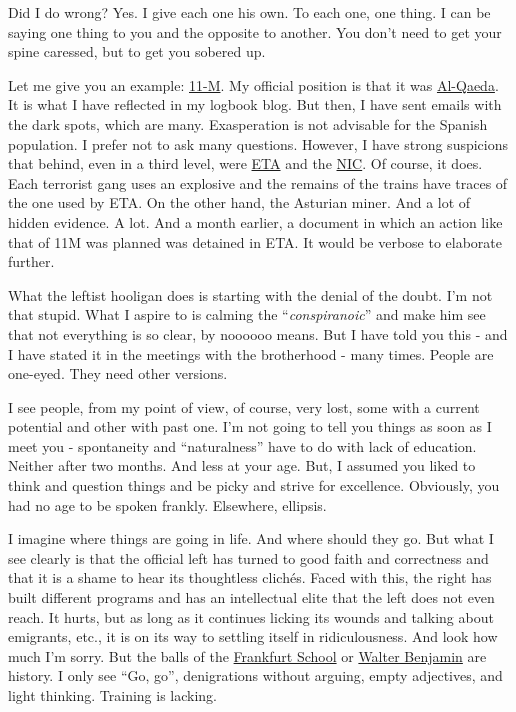 \documentclass[]{book}
\begin{document}
Did I do wrong? Yes. I give each one his own. To each one, one thing. I can be saying one thing to you and the opposite to another. You don't need to get your spine caressed, but to get you sobered up.

Let me give you an example: \href{https://en.wikipedia.org/wiki/2004_Madrid_train_bombings}{11-M}. My official position is that it was \href{https://en.wikipedia.org/wiki/Al-Qaeda}{Al-Qaeda}. It is what I have reflected in my logbook blog. But then, I have sent emails with the dark spots, which are many. Exasperation is not advisable for the Spanish population. I prefer not to ask many questions. However, I have strong suspicions that behind, even in a third level, were \href{https://en.wikipedia.org/wiki/ETA_(separatist_group)}{ETA} and the \href{https://en.wikipedia.org/wiki/National_Intelligence_Centre}{NIC}. Of course, it does. Each terrorist gang uses an explosive and the remains of the trains have traces of the one used by ETA. On the other hand, the Asturian miner. And a lot of hidden evidence. A lot. And a month earlier, a document in which an action like that of 11M was planned was detained in ETA. It would be verbose to elaborate further.

What the leftist hooligan does is starting with the denial of the doubt. I'm not that stupid. What I aspire to is calming the ``\emph{conspiranoic}'' and make him see that not everything is so clear, by noooooo means. But I have told you this - and I have stated it in the meetings with the brotherhood - many times. People are one-eyed. They need other versions.

I see people, from my point of view, of course, very lost, some with a current potential and other with past one. I'm not going to tell you things as soon as I meet you - spontaneity and ``naturalness'' have to do with lack of education. Neither after two months. And less at your age. But, I assumed you liked to think and question things and be picky and strive for excellence. Obviously, you had no age to be spoken frankly. Elsewhere, ellipsis.

I imagine where things are going in life. And where should they go. But what I see clearly is that the official left has turned to good faith and correctness and that it is a shame to hear its thoughtless clichés. Faced with this, the right has built different programs and has an intellectual elite that the left does not even reach. It hurts, but as long as it continues licking its wounds and talking about emigrants, etc., it is on its way to settling itself in ridiculousness. And look how much I'm sorry. But the balls of the \href{https://en.wikipedia.org/wiki/Frankfurt_School}{Frankfurt School} or \href{https://en.wikipedia.org/wiki/Walter_Benjamin}{Walter Benjamin} are history. I only see ``Go, go'', denigrations without arguing, empty adjectives, and light thinking. Training is lacking.
\end{document}
